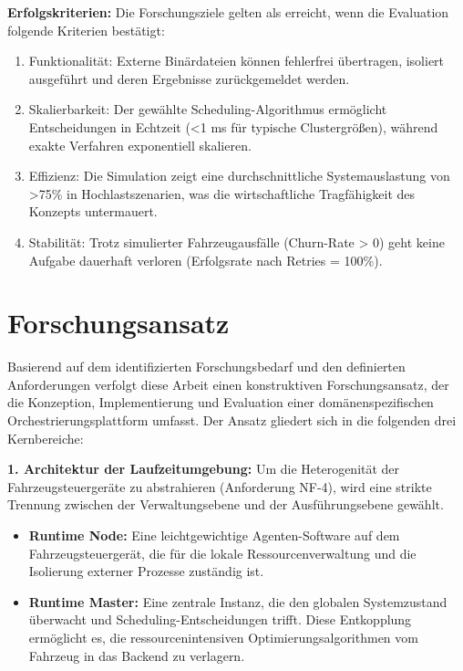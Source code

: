 \textbf{Erfolgskriterien:} Die Forschungsziele gelten als erreicht, wenn die Evaluation folgende Kriterien bestätigt:

\begin{enumerate}
    \item Funktionalität: Externe Binärdateien können fehlerfrei übertragen, isoliert ausgeführt und deren Ergebnisse zurückgemeldet werden.
    \item Skalierbarkeit: Der gewählte Scheduling-Algorithmus ermöglicht Entscheidungen in Echtzeit (<1 ms für typische Clustergrößen), während exakte Verfahren exponentiell skalieren.
    \item Effizienz: Die Simulation zeigt eine durchschnittliche Systemauslastung von >75\% in Hochlastszenarien, was die wirtschaftliche Tragfähigkeit des Konzepts untermauert.
    \item Stabilität: Trotz simulierter Fahrzeugausfälle (Churn-Rate > 0) geht keine Aufgabe dauerhaft verloren (Erfolgsrate nach Retries = 100\%).
\end{enumerate}

\section{Forschungsansatz}
\label{Forschungsansatz}

Basierend auf dem identifizierten Forschungsbedarf und den definierten Anforderungen verfolgt diese Arbeit einen konstruktiven Forschungsansatz, der die Konzeption, Implementierung und Evaluation einer domänenspezifischen Orchestrierungsplattform umfasst. Der Ansatz gliedert sich in die folgenden drei Kernbereiche:

\textbf{1. Architektur der Laufzeitumgebung:} Um die Heterogenität der Fahrzeugsteuergeräte zu abstrahieren (Anforderung NF-4), wird eine strikte Trennung zwischen der Verwaltungsebene und der Ausführungsebene gewählt.

\begin{itemize}
    \item \textbf{Runtime Node:} Eine leichtgewichtige Agenten-Software auf dem Fahrzeugsteuergerät, die für die lokale Ressourcenverwaltung und die Isolierung externer Prozesse zuständig ist.
    \item \textbf{Runtime Master:} Eine zentrale Instanz, die den globalen Systemzustand überwacht und Scheduling-Entscheidungen trifft. Diese Entkopplung ermöglicht es, die ressourcenintensiven Optimierungsalgorithmen vom Fahrzeug in das Backend zu verlagern.
\end{itemize}

